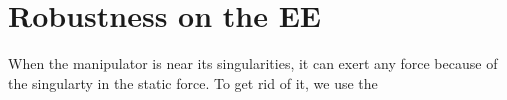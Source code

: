 \documentclass[utf8]{article}
\begin{document}
\section{Robustness on the EE}
When the manipulator is near its singularities, it can exert any force because of the singularty in the static force. To get rid of it, we use the 



\end{document}

